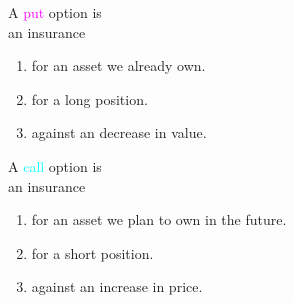 \begin{frame}[fragile]
	\begin{center}

		\begin{minipage}{0.5\textwidth}
			\centering

			A \textcolor{magenta}{put} option is \\
			\alert{an insurance}                 \\

			\begin{enumerate}
				\item for an asset we already own.
				\item for a long position.
				\item against an decrease in value.
			\end{enumerate}
		\end{minipage}

		\pause
		\bigskip
		\mySeparateLine
		\bigskip

		\begin{minipage}{0.5\textwidth}
			\centering

			A \textcolor{cyan}{call} option is \\
			\alert{an insurance}               \\

			\begin{enumerate}
				\item for an asset we plan to own in the future.
				\item for a short position.
				\item against an increase in price.
			\end{enumerate}
		\end{minipage}
	\end{center}

\end{frame}
